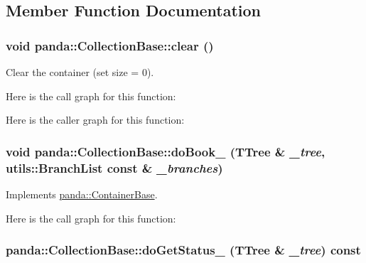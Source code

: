 \subsection{Member Function Documentation}
\hypertarget{classpanda_1_1CollectionBase_a5820623424a01aa34f3988ead2612576}{
\subsubsection[{clear}]{\setlength{\rightskip}{0pt plus 5cm}void panda::CollectionBase::clear ()}}
\label{classpanda_1_1CollectionBase_a5820623424a01aa34f3988ead2612576}


Clear the container (set size = 0). 

Here is the call graph for this function:

Here is the caller graph for this function:\hypertarget{classpanda_1_1CollectionBase_a55e90bbac83f59d93a938dbe57c871c0}{
\subsubsection[{doBook\_\-}]{\setlength{\rightskip}{0pt plus 5cm}void panda::CollectionBase::doBook\_\- (TTree \& {\em \_\-tree}, \/  {\bf utils::BranchList} const \& {\em \_\-branches})}}
\label{classpanda_1_1CollectionBase_a55e90bbac83f59d93a938dbe57c871c0}


Implements \hyperlink{classpanda_1_1ContainerBase_acb14a3b21278b32716445c846017b664}{panda::ContainerBase}.

Here is the call graph for this function:\hypertarget{classpanda_1_1CollectionBase_a885ed7e0cd0d0f37f913db20597fcd3c}{
\subsubsection[{doGetStatus\_\-}]{ panda::CollectionBase::doGetStatus\_\- (TTree \& {\em \_\-tree}) const}}
\label{classpanda_1_1CollectionBase_a885ed7e0cd0d0f37f913db20597fcd3c}



